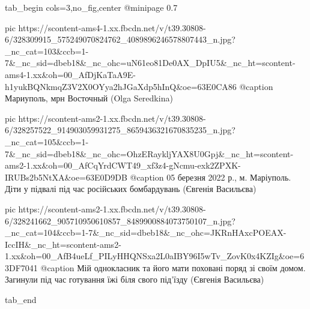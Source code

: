  
 
 
 
 


\begin{minipage}{\textwidth}

\ifcmt
  tab_begin cols=3,no_fig,center
     @minipage 0.7

     pic https://scontent-ams4-1.xx.fbcdn.net/v/t39.30808-6/328309915_575249070824762_4089896246578807443_n.jpg?_nc_cat=103&ccb=1-7&_nc_sid=dbeb18&_nc_ohc=uN61eo81De0AX_DpIU5&_nc_ht=scontent-ams4-1.xx&oh=00_AfDjKaTaA9E-h1yukBQNkmqZ3V2X0OYya2hJGaXdp5hInQ&oe=63E0CA86
     @caption Мариуполь, мрн Восточный (Olga Seredkina)

     pic https://scontent-ams2-1.xx.fbcdn.net/v/t39.30808-6/328257522_914903059931275_8659436321670835235_n.jpg?_nc_cat=105&ccb=1-7&_nc_sid=dbeb18&_nc_ohc=OhzERaykljYAX8U0Gpj&_nc_ht=scontent-ams2-1.xx&oh=00_AfCqYrdCWT49_xf3z4-gNcmu-exk2ZPXK-IRUBs2b5NtXA&oe=63E0D9DB
     @caption 05 березня 2022 р., м. Маріуполь. Діти у підвалі під час російських бомбардувань (Євгенія Васильєва)

     pic https://scontent-ams2-1.xx.fbcdn.net/v/t39.30808-6/328241662_905710950610857_8489900884073750107_n.jpg?_nc_cat=104&ccb=1-7&_nc_sid=dbeb18&_nc_ohc=JKRnHAxcPOEAX-IccIH&_nc_ht=scontent-ams2-1.xx&oh=00_AfB4ueLf_PILyHHQNSxa2L0aIBY96I5wTv_ZovK0x4KZIg&oe=63DF7041
     @caption Мій однокласник та його мати поховані поряд зі своїм домом. Загинули під час готування їжі біля свого під'їзду (Євгенія Васильєва)

  tab_end
\fi
\end{minipage}
